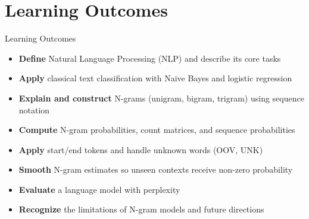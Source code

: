 \section{Learning Outcomes}
\begin{frame}{Learning Outcomes}
    \begin{itemize}
        \setlength{\itemsep}{0.6em}
        \item \textbf{Define} Natural Language Processing (NLP) and describe its core tasks
        \item \textbf{Apply} classical text classification with Naive Bayes and logistic regression
        \item \textbf{Explain and construct} N-grams (unigram, bigram, trigram) using sequence notation
        \item \textbf{Compute} N-gram probabilities, count matrices, and sequence probabilities
        \item \textbf{Apply} start/end tokens and handle unknown words (OOV, UNK)
        \item \textbf{Smooth} N-gram estimates so unseen contexts receive non-zero probability
        \item \textbf{Evaluate} a language model with perplexity
        \item \textbf{Recognize} the limitations of N-gram models and future directions
    \end{itemize}
\end{frame}
